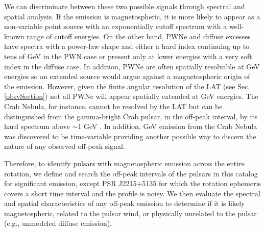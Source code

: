 We can discriminate between these two possible
signals through spectral and spatial analysis.  If the emission is
magnetospheric, it is more likely to appear as a non-variable point source
with an exponentially cutoff spectrum with a well-known range of cutoff energies.  
On the other hand, PWNe and diffuse excesses have spectra with a power-law shape and either a hard index continuing up to tens of GeV in the PWN case or present only at lower energies with a very soft index in the diffuse case.  
In addition, PWNe
are often spatially resolvable at GeV energies \citep[e.g., Vela-X has been spatially resolved with the LAT and \textit{AGILE}
and HESS J1825$-$137 with the LAT;][respectively]{LAT_collaboration_Vela_X_2010,AGILE_VelaX,LAT_collaboration_HESS_J1825_2011}
so an extended source would argue against a magnetospheric origin
of the emission.  However, given the finite angular resolution of
the LAT (see Sec. \ref{obsvSection}) not all PWNe will appear
spatially extended at GeV energies.  The Crab Nebula, for instance,
cannot be resolved by the LAT but can be distinguished from the
gamma-bright Crab pulsar, in the off-peak interval, by its hard
spectrum above $\sim$1 GeV \citep{FermiCrab}.  In addition, GeV
emission from the Crab Nebula was discovered to be time-variable
\citep[e.g.,][]{LAT_Collaboration_Crab_Flare_2011} providing another
possible way to discern the nature of any observed off-peak signal.


Therefore, to identify pulsars with magnetospheric emission across
the entire rotation, we define and search the off-peak intervals of
the pulsars in this catalog for significant emission, except PSR J2215+5135 for
which the rotation ephemeris covers a short time interval and the profile is noisy.
We then evaluate the spectral and spatial characteristics of any off-peak emission
to determine if it is likely magnetospheric, related to the pulsar wind,
or physically unrelated to the pulsar (e.g., unmodeled diffuse emission).
